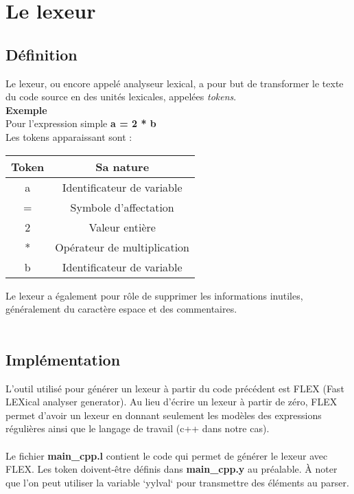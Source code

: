 \documentclass[a4paper]{article}
\begin{document}

\clearpage{}
\setcounter{secnumdepth}{1}
\section{Le lexeur}

\subsection{Définition}

 Le lexeur, ou encore appelé analyseur lexical, a pour but de transformer le texte du code source en des unités lexicales, appelées \textit{tokens}. \\
 
    \textbf{Exemple} \\
    Pour l'expression simple \textbf{a = 2 * b} \\
    Les tokens apparaissant sont : \\
    \begin{center}
    \begin{tabular}{ | c | c | }
    \hline
    \textbf{Token} & \textbf{Sa nature} \\ 
    \hline
    a & Identificateur de variable \\ 
    \hline
    = & Symbole d'affectation \\  
    \hline
    2 & Valeur entière \\
    \hline
    * & Opérateur de multiplication \\
    \hline
    b & Identificateur de variable \\
    \hline
\end{tabular}
\end{center}

Le lexeur a également pour rôle de supprimer les informations inutiles, généralement du caractère espace et des commentaires.\\~\\

\subsection{Implémentation}
L'outil utilisé pour générer un lexeur à partir du code précédent est FLEX (Fast LEXical analyser generator). Au lieu d'écrire un lexeur à partir de zéro, FLEX permet d'avoir un lexeur en donnant seulement les modèles des expressions régulières ainsi que le langage de travail (c++ dans notre cas).\\~\\
\noindent
Le fichier \textbf{main\_cpp.l} contient le code qui permet de générer le lexeur avec FLEX. Les token doivent-être définis dans \textbf{main\_cpp.y} au préalable.
À noter que l'on peut utiliser la variable `yylval` pour transmettre des
éléments au parser.\\
\end{document}
